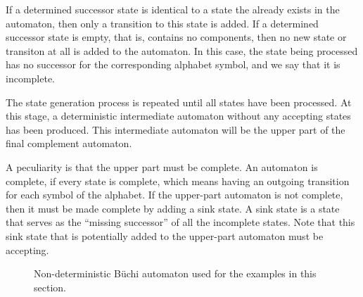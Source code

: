 If a determined successor state is identical to a state the already exists in the automaton, then only a transition to this state is added. If a determined successor state is empty, that is, contains no components, then no new state or transiton at all is added to the automaton. In this case, the state being processed has no successor for the corresponding alphabet symbol, and we say that it is incomplete.

The state generation process is repeated until all states have been processed. At this stage, a deterministic intermediate automaton without any accepting states has been produced. This intermediate automaton will be the upper part of the final complement automaton.

A peculiarity is that the upper part must be complete. An automaton is complete, if every state is complete, which means having an outgoing transition for each symbol of the alphabet. If the upper-part automaton is not complete, then it must be made complete by adding a sink state. A sink state is a state that serves as the ``missing successor'' of all the incomplete states. Note that this sink state that is potentially added to the upper-part automaton must be accepting.

\begin{figure}[htb]
\centering
\Automaton
\caption{Non-deterministic Büchi automaton used for the examples in this section.}
\label{ex_aut_2}
\end{figure}





